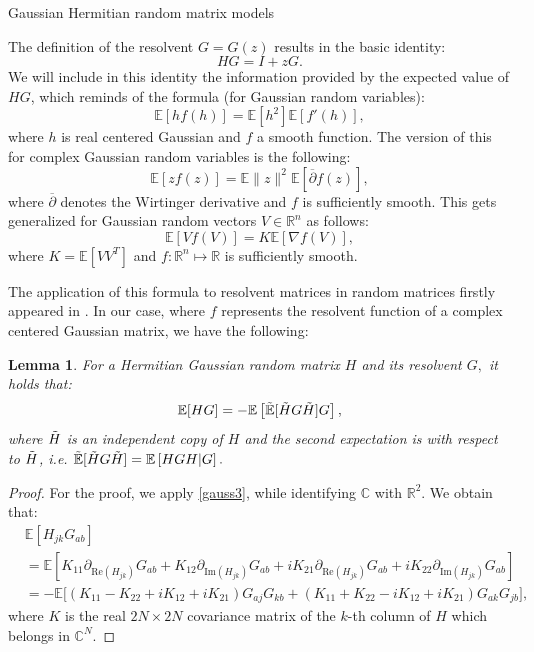 \documentclass[11pt, a4paper, oneside]{book}
\numberwithin{equation}{chapter}
\newcommand{\E}{\mathbb E}
\newcommand{\beq}{\begin{equation}}
\newcommand{\eeq}{\end{equation}}
\newtheorem{lem}[thm]{Lemma}
\begin{document}
\begin{section}{Gaussian Hermitian random matrix models} \label{s:GUE}

The definition of the resolvent $G=G(z)$ results in the basic identity:
\beq \label{HG1}
HG = I + zG.
\eeq
We will include in this identity the information provided by the expected value of $HG$, which reminds of the formula (for Gaussian random variables):
\beq \label{gauss1}
\E [ h f(h)] = \E [h^2] \E[ f'(h) ],
\eeq
where $h$ is real centered Gaussian and $f$ a smooth function. The version of this for complex Gaussian random variables is the following:
\beq \label{gauss2}
\E[zf(z)] = \E \|z \|^2 \E \left [ \overline{\partial} f (z) \right ],
\eeq
where $\overline{\partial}$ denotes the Wirtinger derivative and $f$ is sufficiently smooth. This gets generalized for Gaussian random vectors $V \in \mathbb{R}^n$ as follows:
\beq \label{gauss3}
\E[ V f(V)] = K \E \left [ \nabla f(V) \right ],
\eeq
%
where $K=\E [ VV^T ]$ and $f:\mathbb{R}^n \mapsto \mathbb{R} $  is sufficiently smooth. 

The application of this formula to resolvent matrices in random matrices firstly appeared in \cite{khorunzhy1996asymptotic}. In our case, where $f$ represents the resolvent function of a complex centered Gaussian matrix, we have the following:
%
\begin{lem} \label{Gauss4}
    For a Hermitian Gaussian random matrix $H$ and its resolvent $G,$ it holds that:
    \beq
    \E [H G] = - \E \left [ \Tilde{\E}[\Tilde{H}G\Tilde{H}] G \right ] ,
    \eeq
    where $\Tilde{H}$ is an independent copy of $H$ and the second expectation is with respect to $\Tilde{H}$, i.e. $\Tilde{\E}[\Tilde{H}G\Tilde{H}] = {\E} \left [ {H}G {H} \middle | G \right ].$
\end{lem}
%
\begin{proof}
    For the proof, we apply \eqref{gauss3}, while identifying $\mathbb{C}$ with $\mathbb{R}^2$. We obtain that:
    \begin{align*}
        &\E[H_{jk}G_{ab}] \\ 
        &= \E \left [ K_{11} \partial_{\mathrm{Re}(H_{jk})} G_{ab} + K_{12} \partial_{\mathrm{Im}(H_{jk})}G_{ab} + i K_{21}\partial_{\mathrm{Re}(H_{jk})} G_{ab} + i K_{22}\partial_{\mathrm{Im}(H_{jk})} G_{ab} \right ] \\
        &= - \E \bigg [ ( K_{11} - K_{22} +iK_{12}+iK_{21} ) G_{aj}G_{kb} + ( K_{11}+K_{22}-iK_{12} +iK_{21} ) G_{ak}G_{jb} \bigg ] ,
    \end{align*}
    where $K$ is the real $2N \times 2N$ covariance matrix of the $k$-th column of $H$ which belongs in $\mathbb{C}^{N}$. 
    

\end{proof}
\end{section}
\end{document}
